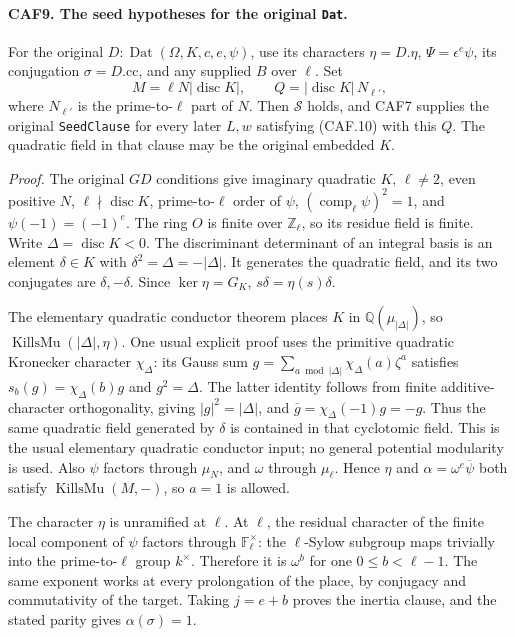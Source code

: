 \paragraph{CAF9. The seed hypotheses for the original \texttt{Dat}.}
\label{claim:CAF9}
For the original \(D:\operatorname{Dat}(\Omega,K,c,e,\psi)\),
use its characters \(\eta=D.\eta\), \(\Psi=\epsilon^e\psi\),
its conjugation \(\sigma=D.\mathrm{cc}\), and any supplied \(B\)
over \(\ell\).  Set
\[
 M=\ell N|\operatorname{disc}K|,
 \qquad Q=|\operatorname{disc}K|\,N_{\ell'},
 \tag{CAF.13}
\]
where \(N_{\ell'}\) is the prime-to-\(\ell\) part of \(N\).
Then \(\mathcal S\) holds, and CAF7 supplies the original
\texttt{SeedClause} for every later \(L,w\) satisfying (CAF.10)
with this \(Q\).  The quadratic field in that clause may be the
original embedded \(K\).

\emph{Proof.}
The original \(GD\) conditions give imaginary quadratic \(K\),
\(\ell\ne2\), even positive \(N\),
\(\ell\nmid\operatorname{disc}K\), prime-to-\(\ell\) order of
\(\psi\), \((\operatorname{comp}_\ell\psi)^2=1\), and
\(\psi(-1)=(-1)^e\).  The ring \(O\) is finite over
\(\mathbb Z_\ell\), so its residue field is finite.
Write \(\Delta=\operatorname{disc}K<0\).  The discriminant
determinant of an integral basis is an element \(\delta\in K\)
with \(\delta^2=\Delta=-|\Delta|\).  It generates the quadratic
field, and its two conjugates are \(\delta,-\delta\).  Since
\(\ker\eta=G_K\), \(s\delta=\eta(s)\delta\).

The elementary quadratic conductor theorem places
\(K\) in \(\mathbb Q(\mu_{|\Delta|})\), so
\(\operatorname{KillsMu}(|\Delta|,\eta)\).  One usual explicit
proof uses the primitive quadratic Kronecker character \(\chi_\Delta\):
its Gauss sum \(g=\sum_{a\bmod |\Delta|}\chi_\Delta(a)\zeta^a\)
satisfies \(s_b(g)=\chi_\Delta(b)g\) and \(g^2=\Delta\).
The latter identity follows from finite additive-character
orthogonality, giving \(|g|^2=|\Delta|\), and
\(\overline g=\chi_\Delta(-1)g=-g\).
Thus the same quadratic field generated by \(\delta\) is contained
in that cyclotomic field.  This is the usual elementary quadratic
conductor input; no general potential modularity is used.
Also \(\psi\) factors through \(\mu_N\), and \(\omega\) through
\(\mu_\ell\).  Hence \(\eta\) and
\(\alpha=\omega^e\overline\psi\) both satisfy
\(\operatorname{KillsMu}(M,-)\), so \(a=1\) is allowed.

The character \(\eta\) is unramified at \(\ell\).
At \(\ell\), the residual character of the finite local component
of \(\psi\) factors through \(\mathbb F_\ell^\times\): the
\(\ell\)-Sylow subgroup maps trivially into the prime-to-\(\ell\)
group \(k^\times\).  Therefore it is \(\omega^b\) for one
\(0\le b<\ell-1\).  The same exponent works at every prolongation
of the place, by conjugacy and commutativity of the target.  Taking
\(j=e+b\) proves the inertia clause, and the stated parity gives
\(\alpha(\sigma)=1\).

